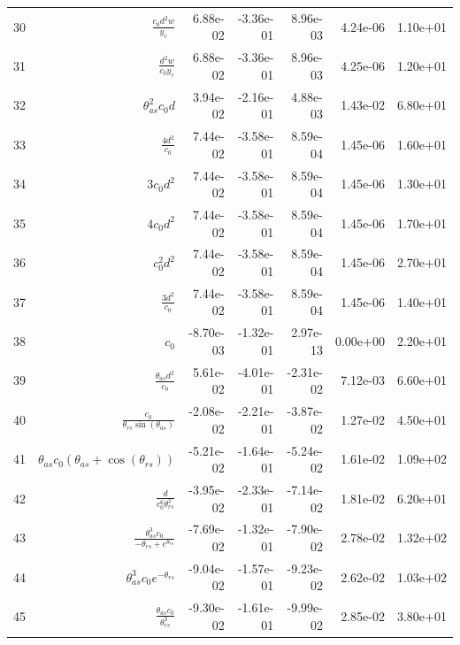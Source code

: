 \begin{tabularx}{\textwidth}{lRRRRRl}
30  &  $ \displaystyle\frac{c_{0} d^{2} w}{y_c} $  &  6.88e-02  &  -3.36e-01  &  8.96e-03  &  4.24e-06  &  1.10e+01  \\ 
31  &  $ \displaystyle\frac{d^{2} w}{c_{0} y_c} $  &  6.88e-02  &  -3.36e-01  &  8.96e-03  &  4.25e-06  &  1.20e+01  \\ 
32  &  $ \theta_{as}^{2} c_{0} d $  &  3.94e-02  &  -2.16e-01  &  4.88e-03  &  1.43e-02  &  6.80e+01  \\ 
33  &  $ \displaystyle\frac{4 d^{2}}{c_{0}} $  &  7.44e-02  &  -3.58e-01  &  8.59e-04  &  1.45e-06  &  1.60e+01  \\ 
34  &  $ 3 c_{0} d^{2} $  &  7.44e-02  &  -3.58e-01  &  8.59e-04  &  1.45e-06  &  1.30e+01  \\ 
35  &  $ 4 c_{0} d^{2} $  &  7.44e-02  &  -3.58e-01  &  8.59e-04  &  1.45e-06  &  1.70e+01  \\ 
36  &  $ c_{0}^{2} d^{2} $  &  7.44e-02  &  -3.58e-01  &  8.59e-04  &  1.45e-06  &  2.70e+01  \\ 
37  &  $ \displaystyle\frac{3 d^{2}}{c_{0}} $  &  7.44e-02  &  -3.58e-01  &  8.59e-04  &  1.45e-06  &  1.40e+01  \\ 
38  &  $ c_{0} $  &  -8.70e-03  &  -1.32e-01  &  2.97e-13  &  0.00e+00  &  2.20e+01  \\ 
39  &  $ \displaystyle\frac{\theta_{as} d^{2}}{c_{0}} $  &  5.61e-02  &  -4.01e-01  &  -2.31e-02  &  7.12e-03  &  6.60e+01  \\ 
40  &  $ \displaystyle\frac{c_{0}}{\theta_{rs} \sin{\left(\theta_{as} \right)}} $  &  -2.08e-02  &  -2.21e-01  &  -3.87e-02  &  1.27e-02  &  4.50e+01  \\ 
41  &  $ \theta_{as} c_{0} \left(\theta_{as} + \cos{\left(\theta_{rs} \right)}\right) $  &  -5.21e-02  &  -1.64e-01  &  -5.24e-02  &  1.61e-02  &  1.09e+02  \\ 
42  &  $ \displaystyle\frac{d}{c_{0}^{6} \theta_{rs}^{2}} $  &  -3.95e-02  &  -2.33e-01  &  -7.14e-02  &  1.81e-02  &  6.20e+01  \\ 
43  &  $ \displaystyle\frac{\theta_{as}^{3} c_{0}}{- \theta_{rs} + e^{\theta_{rs}}} $  &  -7.69e-02  &  -1.32e-01  &  -7.90e-02  &  2.78e-02  &  1.32e+02  \\ 
44  &  $ \theta_{as}^{3} c_{0} e^{- \theta_{rs}} $  &  -9.04e-02  &  -1.57e-01  &  -9.23e-02  &  2.62e-02  &  1.03e+02  \\ 
45  &  $ \displaystyle\frac{\theta_{as} c_{0}}{\theta_{rs}^{3}} $  &  -9.30e-02  &  -1.61e-01  &  -9.99e-02  &  2.85e-02  &  3.80e+01  \\ 

\end{tabularx}
